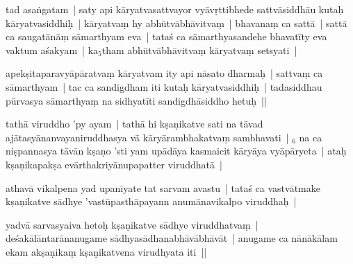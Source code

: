 \documentclass[article,12pt,a4paper]{memoir}%
\newcounter{parCount}
\begin{document}
	  \pstart \leavevmode%
	\label{thakur75-71.18}tad asaṅgatam | saty api kāryatvasattvayor vyāvṛttibhede \label{ratnakīrtinibandhāvali__36r1PF7IMT62ZHYE66V9OBOAHB0}sattvāsiddhāu\label{ratnakīrtinibandhāvali__36r1PF7IMT4VU9YSDDOV432L8BV} kutaḥ kāryatvasiddhiḥ | kāryatvaṃ hy abhūtvābhāvitvaṃ | bhavanaṃ ca sattā | sattā ca saugatānāṃ sāmarthyam eva | tataś ca sāmarthyasandehe bhavatīty eva vaktum aśakyam | ka{\tiny $_{5}$}tham abhūtvābhāvitvaṃ kāryatvaṃ setsyati |
	{}
	\pend%
      

	  \pstart \leavevmode%
	\label{thakur75-71.21}apekṣitaparavyāpāratvaṃ kāryatvam ity api nāsato dharmaḥ | sattvaṃ ca sāmarthyam | tac ca sandigdham iti kutaḥ kāryatvasiddhiḥ | tadasiddhau pūrvasya sāmarthyaṃ na sidhyatīti sandigdhāsiddho hetuḥ ||
	{}
	\pend%
      

	  \pstart \leavevmode%
	\label{thakur75-71.24}tathā viruddho 'py ayam | tathā hi kṣaṇikatve sati na tāvad ajātasyānanvayaniruddhasya vā kāryārambhakatvaṃ sambhavati | {\tiny $_{6}$} na ca niṣpannasya tāvān kṣaṇo 'sti yam upādāya kasmaicit kāryāya vyāpāryeta | ataḥ kṣaṇikapakṣa evārthakriyānupapatter viruddhatā |
	{}
	\pend%
      

	  \pstart \leavevmode%
	\label{thakur75-71.27}athavā vikalpena yad upanīyate tat sarvam avastu | tataś ca vastvātmake kṣaṇikatve sādhye 'vastūpasthāpayann anumānavikalpo viruddhaḥ |
	{}
	\pend%
      

	  \pstart \leavevmode%
	\label{thakur75-71.28}yadvā sarvasyaiva hetoḥ kṣaṇikatve sādhye viruddhatvaṃ | deśakālāntarānanugame sādhyasādhanabhāvābhāvāt | anugame ca nānākālam ekam akṣaṇikaṃ kṣaṇikatvena virudhyata iti ||
	{}
	\pend%
      
\end{document}
